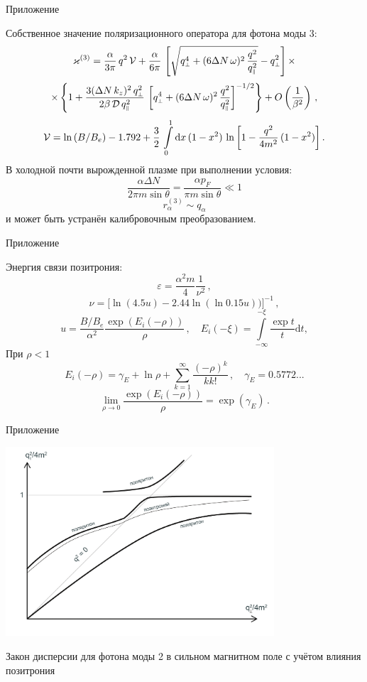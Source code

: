 \documentclass{beamer}
\def\mprp{\mbox{\tiny $\bot$}}
\def\mprl{\mbox{\tiny $\|$}}
\newcommand{\dd}{\mathrm{d}}
\begin{document}
\begin{frame}{Приложение}
\begin{center}
Собственное значение поляризационного оператора для фотона моды 3:
$$\varkappa^{(3)} = \frac{\alpha}{3\pi} \, q^2 \, {\cal V} + \frac{\alpha}{6\pi} \, \left [ 
  \sqrt{q^4_{\mprp} + 
(6 \Delta N \, \omega)^2\, \frac{q^2}{q_{\mprl}^2}}  - q^2_{\mprp} \right ] \times$$ 
$$\times \left \{ 1 + \frac{3( \Delta N \, k_z)^2 \, q^2_{\mprp}}{2\beta \, 
{\cal D} \, q^2_{\mprl}}\, \left [ q^4_{\mprp} + 
(6\Delta N \, \omega)^2\, \frac{q^2}{q_{\mprl}^2} \right ]^{-1/2} \right \}
+ O \left (\frac{1}{\beta^2} \right)  \, ,$$
$${\cal V} = \ln{(B/B_e)} - 1.792 + \frac{3}{2} \, \int\limits_0^1 \dd x \, (1-x^2) \, 
\ln{\left [1- \frac{q^2}{4m^2} \, (1-x^2) \right ]} \, .$$
В холодной почти вырожденной плазме при выполнении условия:
$$\frac{\alpha \Delta N}{2 \pi m \sin{\theta}} = \frac{\alpha p_F}{\pi m \sin{\theta}} \ll 1$$
$$r_{\alpha}^{(3)}\sim q_{\alpha}$$
и может быть устранён калибровочным преобразованием.
\end{center}
\end{frame}
\begin{frame}{Приложение}
\begin{center}
Энергия связи позитрония:
$$\varepsilon = \frac{\alpha^2 m}{4} \frac{1}{\nu^2}\, ,$$
$$\nu = \big [\ln (4.5 u) -2.44 \ln (\ln 0.15 u)) \big ]^{-1}\, ,$$
$$u = \frac{B / B_e}{\alpha^2} \frac{\exp (E_i (-\rho))}{\rho} \,,\quad E_i (-\xi) = \int\limits_{-\infty}^{-\xi} \frac{\exp t}{t} \dd t,$$
При $\rho < 1$
$$E_i (-\rho) = \gamma_E + \ln \rho + \sum\limits_{k=1}^{\infty} \frac{(-\rho)^k}{kk!} \, , \quad \gamma_E = 0.5772...$$
$$\lim_{\rho\to 0} \frac{\exp (E_i (-\rho))}{\rho} = \exp (\gamma_E)\, .$$
\end{center}
\end{frame}
\begin{frame}{Приложение}
\begin{center}
\includegraphics[width=10cm]{Disp.jpg}

Закон дисперсии для фотона моды 2 в сильном магнитном поле с учётом влияния позитрония
\end{center}
\end{frame}
\end{document}
